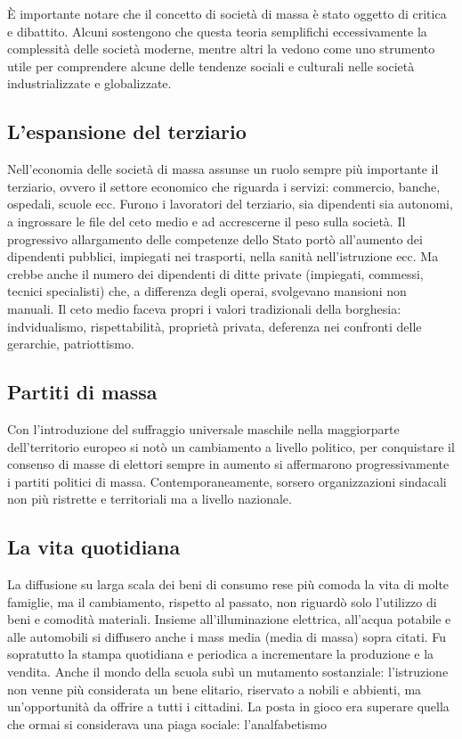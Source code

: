 \documentclass{report}
\begin{document}
È importante notare che il concetto di società di massa è stato oggetto di critica e dibattito. Alcuni sostengono che questa teoria semplifichi eccessivamente la complessità delle società moderne, mentre altri la vedono come uno strumento utile per comprendere alcune delle tendenze sociali e culturali nelle società industrializzate e globalizzate.

\subsection{L'espansione del terziario}
Nell'economia delle società di massa assunse un ruolo sempre più importante il terziario, ovvero il settore economico che riguarda i servizi: commercio, banche, ospedali, scuole ecc. 
Furono i lavoratori del terziario, sia dipendenti sia autonomi, a ingrossare le file del ceto medio e ad accrescerne il peso sulla società.
Il progressivo allargamento delle competenze dello Stato portò all'aumento dei dipendenti pubblici, impiegati nei trasporti, nella sanità nell'istruzione ecc. Ma crebbe anche il numero dei dipendenti di ditte private (impiegati, commessi, tecnici specialisti) che, a differenza degli operai, svolgevano mansioni non manuali. Il ceto medio faceva propri i valori tradizionali della borghesia: indvidualismo, rispettabilità, proprietà privata, deferenza nei confronti delle gerarchie, patriottismo.

\subsection{Partiti di massa}
Con l'introduzione del suffraggio universale maschile nella maggiorparte dell'territorio europeo si notò un cambiamento a livello politico, per conquistare il consenso di masse di elettori sempre in aumento si affermarono progressivamente i partiti politici di massa. Contemporaneamente, sorsero organizzazioni sindacali non più ristrette e territoriali ma a livello nazionale.

\subsection{La vita quotidiana}
La diffusione su larga scala dei beni di consumo rese più comoda la vita di molte famiglie, ma il cambiamento, rispetto al passato, non riguardò solo l'utilizzo di beni e comodità materiali. Insieme all'illuminazione elettrica, all'acqua potabile e alle automobili si diffusero anche i mass media (media di massa) sopra citati. Fu sopratutto la stampa quotidiana e periodica a incrementare la produzione e la vendita. Anche il mondo della scuola subì un mutamento sostanziale: l'istruzione non venne più considerata un bene elitario, riservato a nobili e abbienti, ma un'opportunità da offrire a tutti i cittadini. La posta in gioco era superare quella che ormai si considerava una piaga sociale: l'analfabetismo
\end{document}

